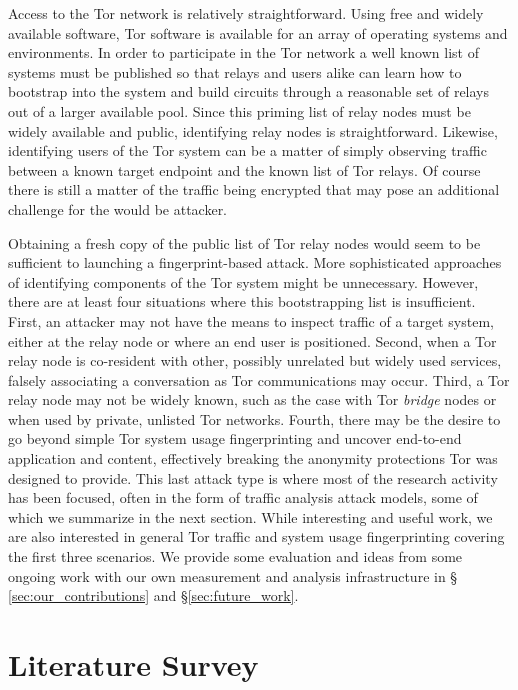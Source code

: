 \documentclass[sigconf]{acmart}
\begin{document}
Access to the Tor network is relatively straightforward.  Using free and
widely available software, Tor software is available for an array of
operating systems and environments.  In order to participate in the Tor
network a well known list of systems must be published so that relays
and users alike can learn how to bootstrap into the system and build
circuits through a reasonable set of relays out of a larger available
pool.  Since this priming list of relay nodes must be widely available
and public, identifying relay nodes is straightforward.  Likewise,
identifying users of the Tor system can be a matter of simply observing
traffic between a known target endpoint and the known list of Tor
relays.  Of course there is still a matter of the traffic being
encrypted that may pose an additional challenge for the would be
attacker.

Obtaining a fresh copy of the public list of Tor relay nodes would seem
to be sufficient to launching a fingerprint-based attack.  More
sophisticated approaches of identifying components of the Tor system
might be unnecessary.  However, there are at least four situations where
this bootstrapping list is insufficient.  First, an attacker may not
have the means to inspect traffic of a target system, either at the
relay node or where an end user is positioned.  Second, when a Tor relay
node is co-resident with other, possibly unrelated but widely used
services, falsely associating a conversation as Tor communications may
occur.  Third, a Tor relay node may not be widely known, such as the
case with Tor \emph{bridge} nodes or when used by private, unlisted Tor
networks.  Fourth, there may be the desire to go beyond simple Tor
system usage fingerprinting and uncover end-to-end application and
content, effectively breaking the anonymity protections Tor was designed
to provide.  This last attack type is where most of the research
activity has been focused, often in the form of traffic analysis attack
models, some of which we summarize in the next section.  While
interesting and useful work, we are also interested in general Tor
traffic and system usage fingerprinting covering the first three
scenarios.  We provide some evaluation and ideas from some ongoing work
with our own measurement and analysis infrastructure in \S
\ref{sec:our_contributions} and \S \ref{sec:future_work}.

\section{Literature Survey}\label{sec:literature_survey}
\end{document}
